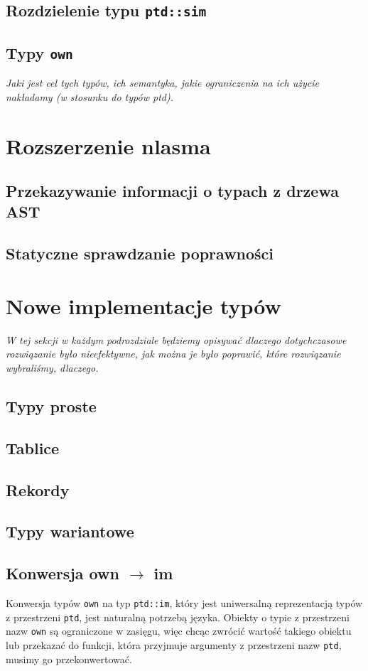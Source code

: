 \documentclass[licencjacka]{pracamgr}
\begin{document}
\section{Rozdzielenie typu \texttt{ptd::sim}}
\section{Typy \texttt{own}}
  \emph{Jaki jest cel tych typów, ich semantyka, jakie ograniczenia na ich użycie
    nakładamy (w stosunku do typów ptd).}


\chapter{Rozszerzenie nlasma}
\section{Przekazywanie informacji o typach z drzewa AST}
\section{Statyczne sprawdzanie poprawności}

\chapter{Nowe implementacje typów}
  \emph{W tej sekcji w każdym podrozdziale będziemy opisywać dlaczego
    dotychczasowe rozwiązanie było nieefektywne, jak można je
    było poprawić, które rozwiązanie wybraliśmy, dlaczego.}
\section{Typy proste}
\section{Tablice}
\section{Rekordy}
\section{Typy wariantowe}
\section{Konwersja own $\rightarrow$ im}
\label{sec:own_to_im}
Konwersja typów \texttt{own} na typ \texttt{ptd::im}, który jest uniwersalną reprezentacją typów z przestrzeni \texttt{ptd},
jest naturalną potrzebą języka. Obiekty o typie z przestrzeni nazw \texttt{own} są ograniczone w zasięgu,
więc chcąc zwrócić wartość takiego obiektu lub przekazać do funkcji, która przyjmuje argumenty z przestrzeni
nazw \texttt{ptd}, musimy go przekonwertować.
\end{document}
